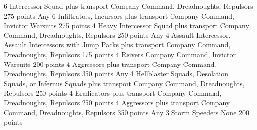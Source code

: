 \documentclass[a4paper, twocolumn]{article}
\begin{document}

          {6 Intercessor Squad plus transport}
          {Company Command, Dreadnoughts, Repulsors}
          {275 points}
          {Any 6 Infiltrators, Incursors plus transport}
          {Company Command, Invictor Warsuits}
          {275 points}
          {4 Heavy Intercessor Squad plus transport}
          {Company Command, Dreadnoughts, Repulsors}
          {250 points}
          {Any 4 Assault Intercessor, Assault Intercessors with Jump Packs plus transport}
          {Company Command, Dreadnoughts, Repulsors}
          {175 points}  
          {4 Reivers}
          {Company Command, Invictor Warsuits}
          {200 points}
          {4 Aggressors plus transport}
          {Company Command, Dreadnoughts, Repulsors}
          {350 points}
          {Any 4 Hellblaster Squads, Desolation Squads, or Infernus Squads plus transport}
          {Company Command, Dreadnoughts, Repulsors}
          {250 points}
          {4 Eradicators plus transport}
          {Company Command, Dreadnoughts, Repulsors}
          {250 points}
          {4 Aggressors plus transport}
          {Company Command, Dreadnoughts, Repulsors}
          {350 points}
          {Any 3 Storm Speeders}
          {None}
          {200 points}
\formationsEND
\end{document}
